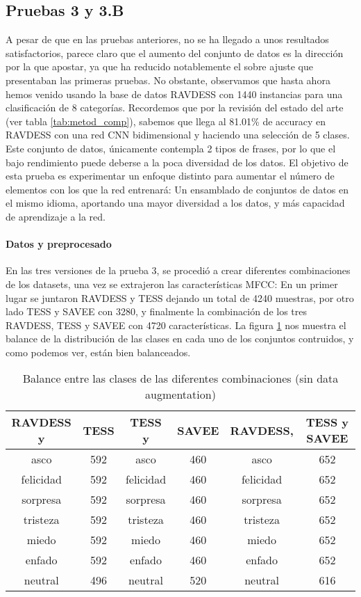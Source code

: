 \documentclass[11pt,a4paper,spanish]{book}
\begin{document}
	\subsection{Pruebas 3 y 3.B} %
	A pesar de que en las pruebas anteriores, no se ha llegado a unos resultados satisfactorios, parece claro que el aumento del conjunto de datos es la dirección por la que apostar, ya que ha reducido notablemente el sobre ajuste que presentaban las primeras pruebas. No obstante, observamos que hasta ahora hemos venido usando la base de datos RAVDESS con 1440 instancias para una clasificación de 8 categorías. Recordemos que por la revisión del estado del arte (ver tabla \ref{tab:metod_comp}), sabemos que \cite{Mustaqeem2020} llega al 81.01\% de accuracy en RAVDESS con una red CNN bidimensional y haciendo una selección de 5 clases. Este conjunto de datos, únicamente contempla 2 tipos de frases, por lo que el bajo rendimiento puede deberse a la poca diversidad de los datos. 
	El objetivo de esta prueba es experimentar un enfoque distinto para aumentar el número de elementos con los que la red entrenará: Un ensamblado de conjuntos de datos en el mismo idioma, aportando una mayor diversidad a los datos, y más capacidad de aprendizaje a la red.
	\paragraph{Datos y preprocesado} En las tres versiones de la prueba 3, se procedió a crear diferentes combinaciones de los datasets, una vez se extrajeron las características MFCC: En un primer lugar se juntaron RAVDESS y TESS dejando un total de 4240 muestras, por otro lado TESS y SAVEE con 3280, y finalmente la combinación de los tres RAVDESS, TESS y SAVEE con 4720 características. La figura \ref{ref:balanceTest3} nos muestra el balance de la distribución de las clases en cada uno de los conjuntos contruidos, y como podemos ver, están bien balanceados.
	\begin{table}[H]
		\centering
		\begin{center}
				\begin{tabular}{ c  c | c  c |c  c }
					RAVDESS y &TESS & TESS y &SAVEE & RAVDESS, &TESS y SAVEE \\
					\hline
					asco 		& 592 & asco 		& 460 & asco 		& 652\\
					felicidad 	& 592 & felicidad 	& 460 & felicidad 	& 652\\
					sorpresa 	& 592 & sorpresa 	& 460 & sorpresa 	& 652\\
					tristeza 	& 592 & tristeza 	& 460 & tristeza 	& 652\\
					miedo 		& 592 & miedo 		& 460 & miedo 		& 652\\
					enfado 		& 592 & enfado 		& 460 & enfado 		& 652\\
					neutral 	& 496 & neutral 	& 520 & neutral 	& 616\\
					\hline
				\end{tabular}
				
			\caption{Balance entre las clases de las diferentes combinaciones (sin data augmentation)}
			\label{ref:balanceTest3}
		\end{center}
	\end{table}
\end{document}
